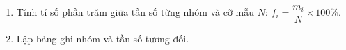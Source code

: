 \begin{enumerate}
\item Tính tỉ số phần trăm giữa tần số từng nhóm và cỡ mẫu $N$: $f_i = \dfrac{m_i}{N} \times 100\%$.
\item Lập bảng ghi nhóm và tần số tương đối.
\end{enumerate}
